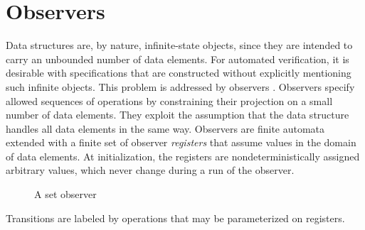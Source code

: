 \section{Observers}
\label{section:observers}
%
Data structures are, by nature, infinite-state objects, since they are intended to carry an unbounded number of data elements. For automated verification, it is desirable with specifications that are constructed without explicitly mentioning such infinite objects.  This problem is addressed by observers \cite{AHHR:integrated:rep}. Observers specify allowed sequences of operations by constraining their projection on a small number of data elements. They exploit the assumption that the data structure handles all data elements in the same way.
Observers are finite automata extended with a finite set of observer \emph{registers} that
assume values in the domain of data elements. At initialization, the registers are nondeterministically assigned arbitrary
values, which never change during a run of the observer. 
\begin{figure}[h]
  \centering
  \vspace{0.3cm}
  \caption{A set observer}
  \label{figure:shape:set:observers}
\end{figure}Transitions are labeled
by operations that may be parameterized on registers. 

